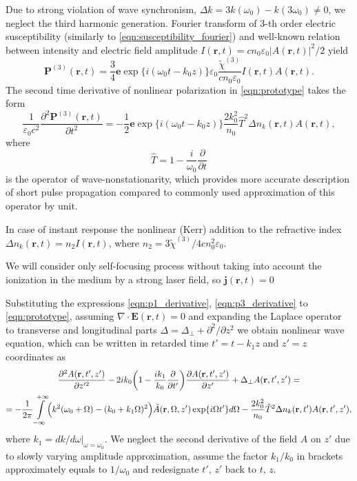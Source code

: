 \documentclass[a4paper, 12pt]{article}
\begin{document}
Due to strong violation of wave synchronism, $\Delta k = 3 k (\omega_0) - k(3 \omega_0) \ne 0$, we neglect the third harmonic generation. Fourier transform of 3-th order electric susceptibility (similarly to \eqref{eqn:susceptibility_fourier}) and well-known relation between intensity and electric field amplitude  $I(\mathbf{r}, t) = c n_0 \varepsilon_0 |A(\mathbf{r}, t)|^2 \bigl/ 2$ yield
\begin{equation}
\mathbf{P}^{(3)}(\mathbf{r}, t) = \frac{3}{4} \mathbf{e} \exp \{ i (\omega_0 t - k_0 z) \} \varepsilon_0 \frac{\tilde{\chi}^{(3)}}{c n_0 \varepsilon_0} I(\mathbf{r}, t) A(\mathbf{r}, t).
\end{equation}
The second time derivative of nonlinear polarization in \eqref{eqn:prototype} takes the form
\begin{equation}
\label{eqn:p3_derivative}
\frac1{\varepsilon_0 c^2} \frac{\partial^2 \mathbf{P}^{(3)}(\mathbf{r}, t)}{\partial t^2} = -\frac1{2} \mathbf{e} \exp \{ i (\omega_0 t - k_0 z) \} \frac{2 k_0^2}{n_0} \hat{T}^2 \Delta n_k(\mathbf{r}, t) A(\mathbf{r}, t), 
\end{equation}
where
\begin{equation}
\hat{T} = 1 - \frac{i}{\omega_0} \frac{\partial}{\partial t}
\end{equation}
is the operator of wave-nonstationarity, which provides more accurate description of short pulse propagation compared to commonly used approximation of this operator by unit.

In case of instant response the nonlinear (Kerr) addition to the refractive index $\Delta n_k(\mathbf{r}, t) = n_2 I(\mathbf{r}, t)$, where $n_2 = 3 \tilde{\chi}^{(3)} \bigl/ 4 c n_0^2 \varepsilon_0$.

We will consider only self-focusing process without taking into account the ionization in the medium by a strong laser field, so $\mathbf{j}(\mathbf{r}, t)=0$

Substituting the expressions \eqref{eqn:p1_derivative}, \eqref{eqn:p3_derivative} to \eqref{eqn:prototype}, assuming $\nabla \cdot \mathbf{E}(\mathbf{r}, t) = 0$ and expanding the Laplace operator to transverse and longitudinal parts $\Delta = \Delta_\perp + \partial^2/\partial z^2$ we obtain nonlinear wave equation, which can be written in retarded time $t'=t-k_1 z$ and $z'=z$ coordinates as
\begin{multline}
\label{eqn:equation_without_dissipation}
\frac{\partial^2 A (\mathbf{r}, t', z')}{\partial z'^2} - 2 i k_0  \biggl( 1 - \frac{i k_1}{k_0} \frac{\partial }{\partial t'}  \biggr) \frac{\partial A (\mathbf{r}, t', z')}{\partial z'} + \Delta_{\perp} A (\mathbf{r}, t', z')= \\ =-\frac1{2 \pi} \int\limits_{-\infty}^{+\infty} \Bigl( k^2(\omega_0 + \Omega) - (k_0 + k_1 \Omega)^2 \Bigr) \tilde{A}(\mathbf{r}, \Omega, z') \exp \{ i \Omega t' \} d \Omega - \frac{2 k_0^2}{n_0} \hat{T}^2 \Delta n_k(\mathbf{r}, t') A(\mathbf{r}, t', z'),
\end{multline}
where $k_1 = dk / d\omega |_{\omega=\omega_0}$. We neglect the second derivative of the field $A$ on $z'$ due to slowly varying amplitude approximation, assume the factor $k_1/k_0$ in brackets approximately equals to $1/\omega_0$ and redesignate $t'$, $z'$ back to $t$, $z$. 
\end{document}

